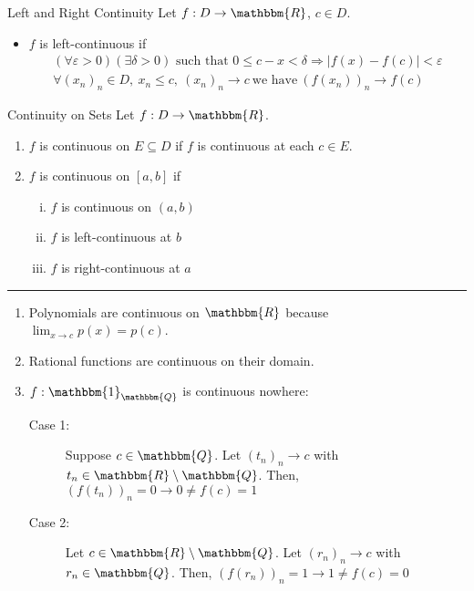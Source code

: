 \documentclass[10pt]{extarticle}
\newcommand{\Q}{\mathbbm{Q}}
\newcommand{\R}{\mathbbm{R}}
\begin{document}
  \begin{problem}{Left and Right Continuity}
    Let $f: D\rightarrow \R$, $c\in D$.
    \begin{itemize}
      \item $f$ is left-continuous if
        \begin{align*}
          (\forall \varepsilon > 0)(\exists \delta > 0) \text{ such that } 0\leq c-x < \delta \Rightarrow |f(x) - f(c)| < \varepsilon\\
          \forall (x_n)_n \in D,~x_n \leq c,~(x_n)_n \rightarrow c~\text{we have}~\left(f(x_n)\right)_n \rightarrow f(c)
        \end{align*}
    \end{itemize}
  \end{problem}
  \begin{problem}{Continuity on Sets}
    Let $f: D\rightarrow \R$.
    \begin{enumerate}[(1)]
      \item $f$ is continuous on $E\subseteq D$ if $f$ is continuous at each $c\in E$.
      \item $f$ is continuous on $[a,b]$ if
        \begin{enumerate}[(i)]
          \item $f$ is continuous on $(a,b)$
          \item $f$ is left-continuous at $b$
          \item $f$ is right-continuous at $a$
        \end{enumerate}
    \end{enumerate}
    \vspace{4pt}
    \rule{\textwidth}{0.4pt}
    \vspace{4pt}
    \begin{enumerate}[(1)]
      \item Polynomials are continuous on $\R$ because $\lim_{x\rightarrow c}p(x) = p(c)$.
      \item Rational functions are continuous on their domain.
      \item $f: \mathbbm{1}_{\Q}$ is continuous nowhere:\\
        \begin{description}
          \item[Case 1:] Suppose $c \in \Q$. Let $(t_n)_n \rightarrow c$ with $t_n \in \R\setminus \Q$. Then, $(f(t_n))_n = 0 \rightarrow 0 \neq f(c) = 1$
          \item[Case 2:] Let $c\in \R \setminus \Q$. Let $(r_n)_n \rightarrow c$ with $r_n \in \Q$. Then, $(f(r_n))_n = 1 \rightarrow 1 \neq f(c) = 0$
        \end{description}
    \end{enumerate}
  \end{problem}
\end{document}
